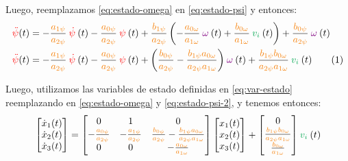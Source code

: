 Luego, reemplazamos \eqref{eq:estado-omega} en \eqref{eq:estado-psi} y entonces:
\begin{align}
  \rojo{\ddot\psi} (t) &= -\frac{\nara{a_{1\psi}}}{\nara{a_{2\psi}}}\rojo{\dot\psi} (t) -
    \frac{\nara{a_{0\psi}}}{\nara{a_{2\psi}}}\rojo{\psi} (t) +
    \frac{\nara{b_{1\psi}}}{\nara{a_{2\psi}}}\left(-\frac{\nara{a_{0\omega}}}{\nara{a_{1\omega}}}\mora{\omega} (t) + \frac{\nara{b_{0\omega}}}{\nara{a_{1\omega}}}\verd{v_{i}} (t)\right) +
    \frac{\nara{b_{0\psi}}}{\nara{a_{2\psi}}}\mora{\omega} (t) \\
  \rojo{\ddot\psi} (t) &= -\frac{\nara{a_{1\psi}}}{\nara{a_{2\psi}}}\rojo{\dot\psi} (t) -
    \frac{\nara{a_{0\psi}}}{\nara{a_{2\psi}}}\rojo{\psi} (t) +
    \left(\frac{\nara{b_{0\psi}}}{\nara{a_{2\psi}}} - \frac{\nara{b_{1\psi}}\nara{a_{0\omega}}}{\nara{a_{2\psi}}\nara{a_{1\omega}}}\right) \mora{\omega} (t) +
    \frac{\nara{b_{1\psi}}\nara{b_{0\omega}}}{\nara{a_{2\psi}}\nara{a_{1\omega}}} \verd{v_{i}} (t)
  \stepcounter{equation}\tag{\theequation}\label{eq:estado-psi-2}
\end{align}

Luego, utilizamos las variables de estado definidas en \eqref{eq:var-estado}
reemplazando en \eqref{eq:estado-omega} y \eqref{eq:estado-psi-2}, y tenemos
entonces:
\begin{equation}\label{eq:matriz_sistema}
  \begin{bmatrix}\dot x_{1}(t) \\ \dot x_{2}(t) \\ \dot x_{3}(t)\end{bmatrix} =
    \begin{bmatrix}
      0 & 1 & 0 \\
      -\frac{\nara{a_{0\psi}}}{\nara{a_{2\psi}}}   & -\frac{\nara{a_{1\psi}}}{\nara{a_{2\psi}}} & \frac{\nara{b_{0\psi}}}{\nara{a_{2\psi}}} - \frac{\nara{b_{1\psi}}\nara{a_{0\omega}}}{\nara{a_{2\psi}}\nara{a_{1\omega}}} \\
      0 & 0 & -\frac{\nara{a_{0\omega}}}{\nara{a_{1\omega}}}
    \end{bmatrix}
    \begin{bmatrix}x_{1}(t) \\ x_{2}(t) \\ x_{3}(t)\end{bmatrix} +
    \begin{bmatrix}
      0 \\
      \frac{\nara{b_{1\psi}}\nara{b_{0\omega}}}{\nara{a_{2\psi}}\nara{a_{1\omega}}} \\
      \frac{\nara{b_{0\omega}}}{\nara{a_{1\omega}}}
    \end{bmatrix}
    \verd{v_{i}} (t)
\end{equation}

